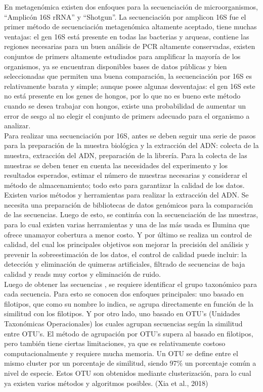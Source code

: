 En metagenómica existen dos enfoques para la secuenciación de microorganismos, “Amplicón 16S rRNA” y “Shotgun”.  La secuenciación por amplicon  16S fue el primer método de secuenciación metagenómica altamente aceptado, tiene muchas ventajas: el gen 16S está presente en todas las bacterias y arqueas, contiene las regiones necesarias para un buen análisis de PCR altamente conservadas,  existen conjuntos de primers altamente estudiados para amplificar la mayoría de los organismos, ya se encuentran disponibles bases de datos públicas y bien seleccionadas que permiten una buena comparación, la secuenciación por 16S es relativamente barata y simple; aunque posee algunas desventajas: el gen 16S este no está presente en los genes de hongos, por lo que no es bueno este método cuando se desea trabajar con hongos, existe una probabilidad de aumentar un error de sesgo al no elegir el conjunto de primers adecuado para el organismo a analizar. \\

Para realizar una secuenciación por 16S, antes se deben seguir una serie de pasos para la preparación de la muestra biológica y la extracción del ADN: colecta de la muestra, extracción del ADN, preparación de la librería. Para la colecta de las muestras se deben tener en cuenta las necesidades del experimento y los resultados esperados, estimar el número de muestras necesarias y considerar el método de almacenamiento; todo esto para garantizar la calidad de los datos. Existen varios métodos y herramientas para realizar la extracción del ADN. Se necesita una preparación de bibliotecas de datos genómicos para la comparación de las secuencias. Luego de esto, se continúa con la secuenciación de las muestras, para lo cual existen varias herramientas y una de las más usada es Ilumina que ofrece unamayor cobertura a menor costo. Y por último se realiza un control de calidad, del cual los principales objetivos son mejorar la precisión del análisis y prevenir la sobreestimación de los datos, el control de calidad puede incluir: la detección y eliminación de quimeras artificiales, filtrado de secuencias de baja calidad y reads muy cortos y eliminación de ruido. \\

Luego de obtener las secuencias , se requiere identificar el grupo taxonómico para cada secuencia. Para esto se conocen dos enfoques principales: uno basado en filotipos, que como su nombre lo indica, se agrupa directamente en función de la similitud con los filotipos. Y por otro lado, uno basado en OTU’s (Unidades Taxonómicas Operacionales) los cuales agrupan secuencias según la similitud entre OTU’s. El método de agrupación por OTU’s supera al basado en filotipos, pero también tiene ciertas limitaciones, ya que es relativamente costoso computacionalmente y requiere mucha memoria. Un OTU se define entre el mismo cluster por un porcentaje de similitud, siendo 97\% un porcentaje común a nivel de especie. Estos OTU son obtenidos mediante clusterización, para lo cual ya existen varios métodos y algoritmos posibles. (Xia et al., 2018) \\

